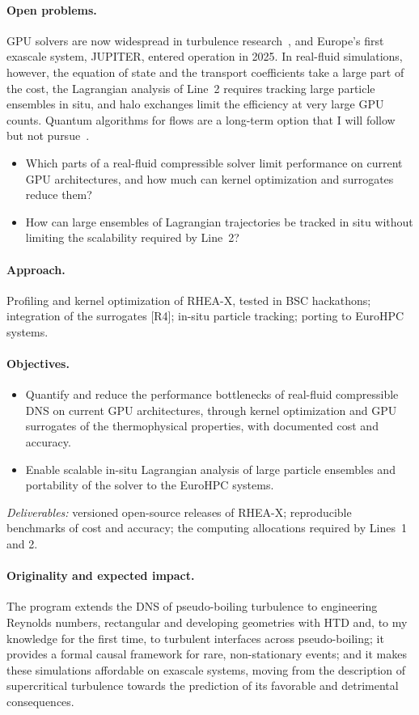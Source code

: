 \documentclass[11pt]{article}
\begin{document}
\paragraph{Open problems.} GPU solvers are now widespread in turbulence
research~\cite{Roccon2026,Bernardini2021,Bernardini2023}, and Europe's first exascale system,
JUPITER, entered operation in 2025. In real-fluid simulations, however, the equation of state and
the transport coefficients take a large part of the cost, the Lagrangian analysis of Line~2
requires tracking large particle ensembles in situ, and halo exchanges limit the efficiency at
very large GPU counts. Quantum algorithms for flows are a long-term option that I will follow but
not pursue~\cite{Bharadwaj2023}.
\begin{itemize}
  \item[\textbf{Q3.1}] Which parts of a real-fluid compressible solver limit performance on
  current GPU architectures, and how much can kernel optimization and surrogates reduce them?
  \item[\textbf{Q3.2}] How can large ensembles of Lagrangian trajectories be tracked in situ
  without limiting the scalability required by Line~2?
\end{itemize}
\paragraph{Approach.} Profiling and kernel optimization of RHEA-X, tested in BSC hackathons;
integration of the surrogates [R4]; in-situ particle tracking; porting to EuroHPC systems.
\paragraph{Objectives.}
\begin{itemize}
  \item[\textbf{O7.}] Quantify and reduce the performance bottlenecks of real-fluid compressible
  DNS on current GPU architectures, through kernel optimization and GPU surrogates of the
  thermophysical properties, with documented cost and accuracy.
  \item[\textbf{O8.}] Enable scalable in-situ Lagrangian analysis of large particle ensembles
  and portability of the solver to the EuroHPC systems.
\end{itemize}
\emph{Deliverables:} versioned open-source releases of RHEA-X; reproducible benchmarks of cost and
accuracy; the computing allocations required by Lines~1 and 2.

\paragraph{Originality and expected impact.} The program extends the DNS of pseudo-boiling
turbulence to engineering Reynolds numbers, rectangular and developing geometries with HTD and,
to my knowledge for the first time, to turbulent interfaces across pseudo-boiling; it provides a
formal causal framework for rare, non-stationary events; and it makes these simulations
affordable on exascale systems, moving from the description of supercritical turbulence towards
the prediction of its favorable and detrimental consequences.
\end{document}

